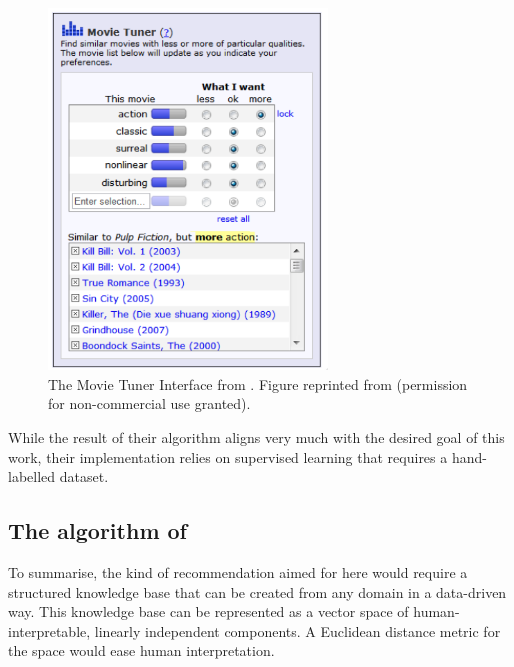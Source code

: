 \begin{figure}[H]
    \centering
    \includegraphics[width=0.66\textwidth]{graphics/stolenfigures/movietuner.png}
    \caption[The Movie Tuner Interface from \cite{VISR12}.]{
        The Movie Tuner Interface from \textcite{VISR12}. Figure reprinted from \cite[Fig.3]{Vig2010} (permission for non-commercial use granted). 
        \label{fig:movietuner}}
\end{figure}

While the result of their algorithm aligns very much with the desired goal of this work, their implementation relies on supervised learning that requires a hand-labelled dataset.

\subsection{The algorithm of \textcite{Derrac2015}}


To summarise, the kind of recommendation aimed for here would require a structured knowledge base that can be created from any domain in a data-driven way. This knowledge base can be represented as a vector space of human-interpretable, linearly independent components. A Euclidean distance metric for the space would ease human interpretation. 

